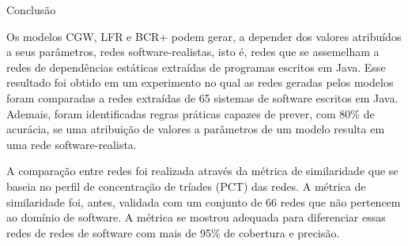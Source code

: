 \begin{section}{Conclusão}
	
	Os modelos CGW, LFR e BCR+ podem gerar, a depender dos valores atribuídos a seus parâmetros, redes software-realistas, isto é, redes que se assemelham a redes de dependências estáticas extraídas de programas escritos em Java. Esse resultado foi obtido em um experimento no qual as redes geradas pelos modelos foram comparadas a redes extraídas de 65 sistemas de software escritos em Java. Ademais, foram identificadas regras práticas capazes de prever, com 80\% de acurácia, se uma atribuição de valores a parâmetros de um modelo resulta em uma rede software-realista.
	
	 A comparação entre redes foi realizada através da métrica de similaridade que se baseia no perfil de concentração de tríades (PCT) das redes. A métrica de similaridade foi, antes, validada com um conjunto de 66 redes que não pertencem ao domínio de software. A métrica se mostrou adequada para diferenciar essas redes de redes de software com mais de 95\% de cobertura e precisão.
	
\end{section}
 
% 
% 
% 
% 
% 
% 
% 
% 
% 
